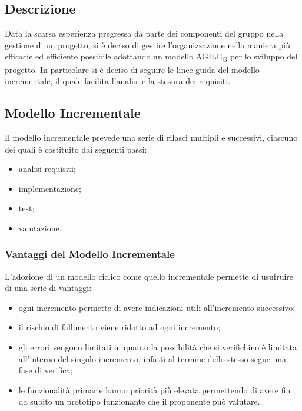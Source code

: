 \subsection{Descrizione}
Data la scarsa esperienza pregressa da parte dei componenti del gruppo nella gestione di un progetto, si è deciso di gestire l'organizzazione nella maniera più efficacie ed efficiente possibile adottando un modello AGILE\textsubscript{G} per lo sviluppo del progetto. In particolare si è deciso di seguire le linee guida del modello incrementale, il quale facilita l'analisi e la stesura dei requisiti. 
\subsection{Modello Incrementale}
Il modello incrementale prevede una serie di rilasci multipli e successivi, ciascuno dei quali è costituito dai seguenti passi: 
\begin{itemize}
    \item analisi requisiti;
    \item implementazione;
    \item test;
    \item valutazione.
\end{itemize}
\subsubsection{Vantaggi del Modello Incrementale}
L'adozione di un modello ciclico come quello incrementale permette di usufruire di una serie di vantaggi: 
\begin{itemize}
    \item ogni incremento permette di avere indicazioni utili all'incremento successivo;
    \item il rischio di fallimento viene ridotto ad ogni incremento;
    \item gli errori vengono limitati in quanto la possibilità che si verifichino è limitata all'interno del singolo incremento, infatti al termine dello stesso segue una fase di verifica;
    \item le funzionalità primarie hanno priorità più elevata permettendo di avere fin da subito un prototipo funzionante che il proponente può valutare.
\end{itemize}
\newpage